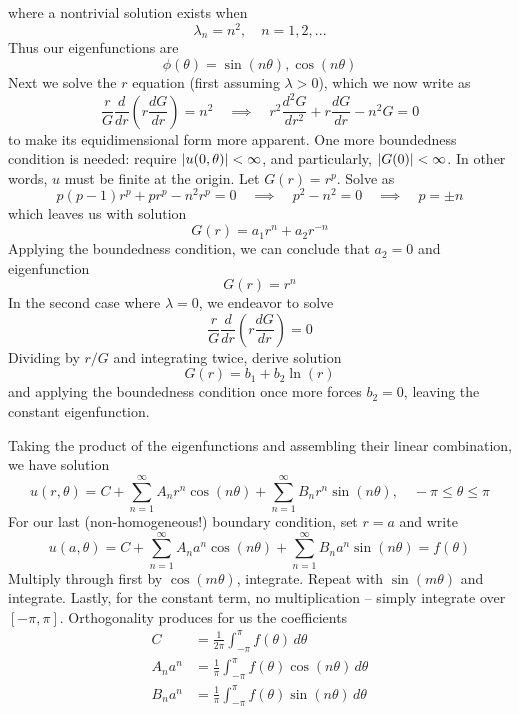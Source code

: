 \documentclass[a4paper]{article}
\begin{document}
where a nontrivial solution exists when
\[
	\lambda_{n} = n^{2}, \quad n = 1, 2, ...
\]
Thus our eigenfunctions are
\[
	\phi \!\left( \theta \right) = \sin\!\left(n \theta\right), \cos\!\left(n \theta\right) 
\]
Next we solve the \( r \) equation (first assuming \( \lambda > 0 \)), which we now write as 
\[
	\frac{r}{G}\frac{d }{d r}\!\left( r \frac{d G}{d r} \right) = n^{2} \quad \implies \quad r^{2}\frac{d^2 G}{d r^2} + r \frac{d G}{d r} - n^{2}G = 0 
\]
to make its equidimensional form more apparent. One more boundedness condition is needed: require \( \abs{u \!\left( 0,\theta \right)} < \infty \), and particularly, \( \abs{G \!\left( 0 \right)} < \infty \). In other words, \( u \) must be finite at the origin. Let \( G \!\left( r \right) = r^{p} \). Solve as 
\[
	p \!\left( p - 1 \right)r^{p} + p r^{p} - n^{2} r^{p} = 0 \quad \implies \quad p^{2} - n^{2} = 0 \quad \implies \quad p = \pm n 
\]
which leaves us with solution
\[
	G \!\left( r \right) = a_{1}r^{n} + a_{2}r^{-n} 
\]
Applying the boundedness condition, we can conclude that \( a_{2} = 0 \) and eigenfunction
\[
	G \!\left( r \right) = r^{n} 
\]
In the second case where \( \lambda = 0 \), we endeavor to solve
\[
	\frac{r}{G}\frac{d }{d r}\!\left( r \frac{d G}{d r} \right) = 0 
\]
Dividing by \( r / G \) and integrating twice, derive solution
\[
	G \!\left( r \right) = b_{1} + b_{2}\ln\!\left(r\right) 
\]
and applying the boundedness condition once more forces \( b_{2} = 0 \), leaving the constant eigenfunction.

Taking the product of the eigenfunctions and assembling their linear combination, we have solution
\[
	u \!\left( r,\theta \right) = C + \sum^{\infty}_{n=1} A_{n}r^{n}\cos\!\left(n \theta\right) + \sum^{\infty}_{n=1} B_{n}r^{n}\sin\!\left(n \theta\right), \quad -\pi \le \theta \le \pi
\]
For our last (non-homogeneous!) boundary condition, set \( r = a \) and write
\[
	u \!\left( a,\theta \right) = C + \sum^{\infty}_{n=1} A_{n}a^{n}\cos\!\left(n \theta\right) + \sum^{\infty}_{n=1} B_{n}a^{n}\sin\!\left(n \theta\right) = f \!\left( \theta \right)
\]
Multiply through first by \( \cos\!\left(m \theta\right) \), integrate. Repeat with \( \sin\!\left(m \theta\right) \) and integrate. Lastly, for the constant term, no multiplication -- simply integrate over \( \!\left[ -\pi,\pi \right] \). Orthogonality produces for us the coefficients
\begin{align*}
	C & = \frac{1}{2 \pi}\int^{\pi}_{-\pi} f \!\left( \theta \right) \, d \theta \\
	A_{n}a^{n} & = \frac{1}{\pi}\int^{\pi}_{-\pi} f \!\left( \theta \right)\cos\!\left(n \theta\right) \, d \theta \\ 
	B_{n}a^{n} & = \frac{1}{\pi}\int^{\pi}_{-\pi} f \!\left( \theta \right)\sin\!\left(n \theta\right) \, d \theta 
\end{align*}
\end{document}
